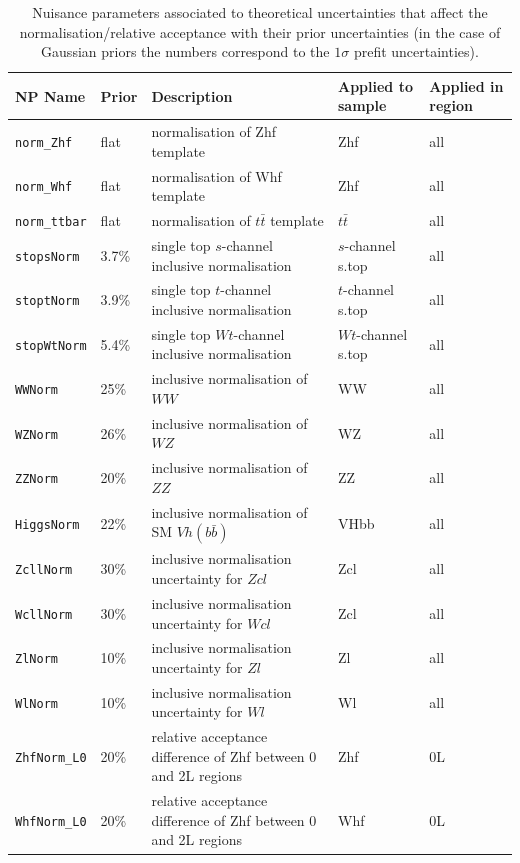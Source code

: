 \begin{table}[ht]
    \centering
    \scriptsize
    \begin{tabular}{|p{2.5cm}|p{1.5cm}|p{3cm}|p{2.5cm}|p{1.5cm}|}
        \hline
        NP Name & Prior & Description & Applied to sample & Applied in region \\
        \hline
        \texttt{norm\_Zhf} & flat & normalisation of Zhf template & Zhf & all \\
        \texttt{norm\_Whf} & flat & normalisation of Whf template & Zhf & all \\
        \texttt{norm\_ttbar} & flat & normalisation of $t\bar{t}$ template & $t\bar{t}$ & all \\
        \hline
        \hline
        \texttt{stopsNorm} & 3.7\% & single top $s$-channel inclusive normalisation & $s$-channel s.top & all \\
        \texttt{stoptNorm} & 3.9\% & single top $t$-channel inclusive normalisation & $t$-channel s.top & all \\
        \texttt{stopWtNorm} & 5.4\% & single top $Wt$-channel inclusive normalisation & $Wt$-channel s.top & all \\
        \texttt{WWNorm} & 25\% & inclusive normalisation of $WW$ & WW & all \\
        \texttt{WZNorm} & 26\% & inclusive normalisation of $WZ$ & WZ & all \\
        \texttt{ZZNorm} & 20\% & inclusive normalisation of $ZZ$ & ZZ & all \\
        \texttt{HiggsNorm} & 22\% & inclusive normalisation of SM $Vh(b\bar{b})$ & VHbb & all \\
        \hline
        \hline
        \texttt{ZcllNorm} & 30\% & inclusive normalisation uncertainty for $Zcl$ & Zcl & all \\
        \texttt{WcllNorm} & 30\% & inclusive normalisation uncertainty for $Wcl$ & Zcl & all \\
        \texttt{ZlNorm} & 10\% & inclusive normalisation uncertainty for $Zl$ & Zl & all \\
        \texttt{WlNorm} & 10\% & inclusive normalisation uncertainty for $Wl$ & Wl & all \\
        \hline
        \hline
        \texttt{ZhfNorm\_L0} & 20\% & relative acceptance difference of Zhf between 0 and 2L regions & Zhf & 0L \\
        \texttt{WhfNorm\_L0} & 20\% & relative acceptance difference of Zhf between 0 and 2L regions & Whf & 0L \\
        \hline
    \end{tabular}
    \caption{Nuisance parameters associated to theoretical uncertainties that affect the normalisation/relative acceptance with their prior uncertainties (in the case of Gaussian priors the numbers correspond to the $1\sigma$ prefit uncertainties).}
    \label{tab:np-norm1}
\end{table}

